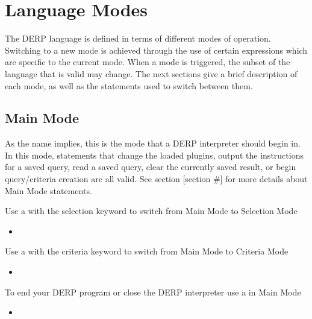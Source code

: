 \section{Language Modes}

The DERP language is defined in terms of different modes of operation.
Switching to a new mode is achieved through the use of certain expressions
which are specific to the current mode. When a mode is triggered, the
subset of the language that is valid may change. The next sections give
a brief description of each mode, as well as the statements used to switch between them.


\subsection{Main Mode}

As the name implies, this is the mode that a DERP interpreter should begin in. In this mode,
statements that change the loaded plugins, output the instructions for a saved query, read a
saved query, clear the currently saved result, or begin query/criteria creation are all valid.
See section [section \#] for more details about Main Mode statements.

Use a  with the selection keyword to switch from Main Mode to Selection Mode
\begin{itemize}[leftmargin=2in]
    \item[\nonterminal{create\_expression}] \bnf{:}    
\end{itemize}

Use a  with the criteria keyword to switch from Main Mode to Criteria Mode
\begin{itemize}[leftmargin=2in]
    \item[\nonterminal{create\_expression}] \bnf{:}    
\end{itemize}

To end your DERP program or close the DERP interpreter use a  in Main Mode
\begin{itemize}[leftmargin=2in]
    \item[\nonterminal{stop\_expression}] \bnf{:}  \bnf{|} 
\end{itemize}


